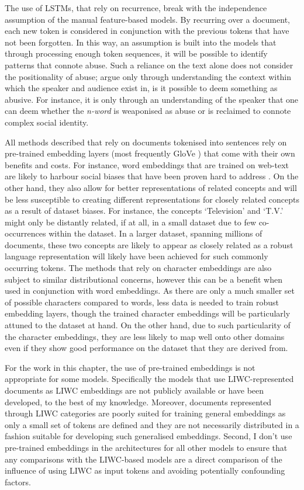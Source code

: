 The use of LSTMs, that rely on recurrence, break with the independence assumption of the manual feature-based models. By recurring over a document, each new token is considered in conjunction with the previous tokens that have not been forgotten. In this way, an assumption is built into the models that through processing enough token sequences, it will be possible to identify patterns that connote abuse. Such a reliance on the text alone does not consider the positionality of abuse; \citet{Waseem:2018} argue only through understanding the context within which the speaker and audience exist in, is it possible to deem something as abusive. For instance, it is only through an understanding of the speaker that one can deem whether the \textit{n-word} is weaponised as abuse or is reclaimed to connote complex social identity.\vspace{5mm}

All methods described that rely on documents tokenised into sentences rely on pre-trained embedding layers (most frequently GloVe \citet{Pennington:2014}) that come with their own benefits and costs. For instance, word embeddings that are trained on web-text are likely to harbour social biases \citep{Bolukbasi:2016} that have been proven hard to address \citep{Gonen:2019}. On the other hand, they also allow for better representations of related concepts and will be less susceptible to creating different representations for closely related concepts as a result of dataset biases. For instance, the concepts `Television' and `T.V.' might only be distantly related, if at all, in a small dataset due to few co-occurrences within the dataset. In a larger dataset, spanning millions of documents, these two concepts are likely to appear as closely related as a robust language representation will likely have been achieved for such commonly occurring tokens.
The methods that rely on character embeddings are also subject to similar distributional concerns, however this can be a benefit when used in conjunction with word embeddings. As there are only a much smaller set of possible characters compared to words, less data is needed to train robust embedding layers, though the trained character embeddings will be particularly attuned to the dataset at hand. On the other hand, due to such particularity of the character embeddings, they are less likely to map well onto other domains even if they show good performance on the dataset that they are derived from.\vspace{5mm}

For the work in this chapter, the use of pre-trained embeddings is not appropriate for some models. Specifically the models that use LIWC-represented documents as LIWC embeddings are not publicly available or have been developed, to the best of my knowledge. Moreover, documents represented through LIWC categories are poorly suited for training general embeddings as only a small set of tokens are defined and they are not necessarily distributed in a fashion suitable for developing such generalised  embeddings. Second, I don't use pre-trained embeddings in the architectures for all other models to ensure that any comparisons with the LIWC-based models are a direct comparison of the influence of using LIWC as input tokens and avoiding potentially confounding factors.

